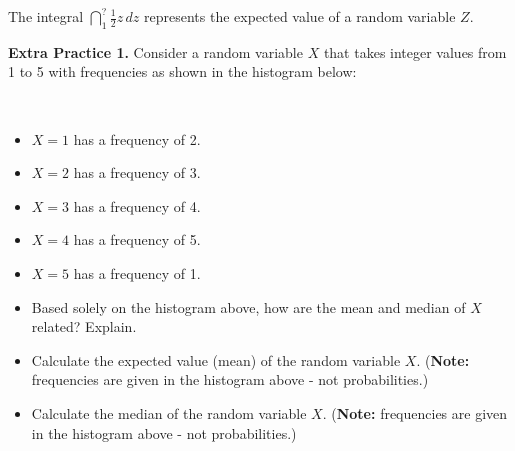\documentclass[10pt]{article}
\begin{document}
\exercise{} The integral $\dint_1^{?} \frac12z\,dz$ represents the expected value of a random variable $Z$.\\



\newpage%

{\bf\color{blue}Extra Practice 1.} 
Consider a random variable \(X\) that takes integer values from 1 to 5 with frequencies as shown in the histogram below:

\begin{center}
\begin{minipage}[t]{0.45\textwidth}
\,\\[-0.2in]
\end{minipage}
%
\quad
%
\begin{minipage}[t]{0.45\textwidth}
\vspace{0.5in}
\begin{itemize}
    \item \(X = 1\) has a frequency of 2.
    \item \(X = 2\) has a frequency of 3.
    \item \(X = 3\) has a frequency of 4.
    \item \(X = 4\) has a frequency of 5.
    \item \(X = 5\) has a frequency of 1.
\end{itemize}
\end{minipage}
\end{center}


\begin{itemize}
\item[(a)] Based solely on the histogram above, how are the mean and median of $X$ related? Explain.
    \vfill

\item[(b)] Calculate the expected value (mean) of the random variable \(X\). ({\bf Note:} frequencies are given in the histogram above - not probabilities.)
    \vfill

\item[(c)] Calculate the median of the random variable $X$. ({\bf Note:} frequencies are given in the histogram above - not probabilities.)
    \vfill
    
\end{itemize}
\end{document}
